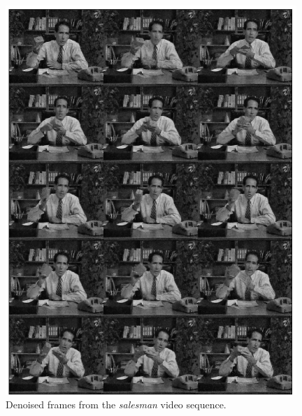\documentclass[twoside,11pt]{article}
\numberwithin{equation}{section}
\numberwithin{theorem}{section}
\begin{document}
\begin{figure}[p]
 \centering
 \includegraphics[width = 0.98\textwidth]{salesman-Aniso}
 \caption{
  \label{fig:videoAniso}
  Denoised frames from the {\it salesman} video sequence.
 }
\end{figure}

\clearpage
\end{document}
